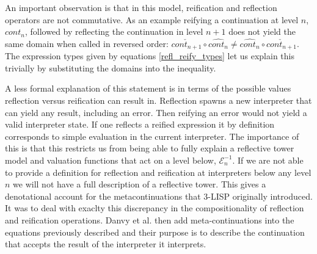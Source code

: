 \documentclass[fleqn]{article}
\theoremstyle{definition}
\begin{document}
An important observation is that in this model, reification and reflection operators are not commutative. As an example reifying a continuation at level $n$, $cont_n$, followed by reflecting the continuation in level $n+1$ does not yield the same domain when called in reversed order: $\check{cont_{n+1}} \circ \hat{cont_n} \neq \hat{cont_n} \circ \check{cont_{n+1}}$. The expression types given by equations \ref{refl_reify_types} let us explain this trivially by substituting the domains into the inequality.

%
%

A less formal explanation of this statement is in terms of the possible values reflection versus reification can result in. Reflection spawns a new interpreter that can yield any result, including an error. Then reifying an error would not yield a valid interpreter state. If one reflects a reified expression it by definition corresponds to simple evaluation in the current interpreter. The importance of this is that this restricts us from being able to fully explain a reflective tower model and valuation functions that act on a level below, $\mathcal{E}^{-1}_n$. If we are not able to provide a definition for reflection and reification at interpreters below any level $n$ we will not have a full description of a reflective tower. This gives a denotational account for the metacontinuations that 3-LISP originally introduced. It was to deal with exaclty this discrepancy in the compositionality of reflection and reification operations. Danvy et al. then add meta-continuations into the equations previously described and their purpose is to describe the continuation that accepts the result of the interpreter it interprets.
\end{document}
